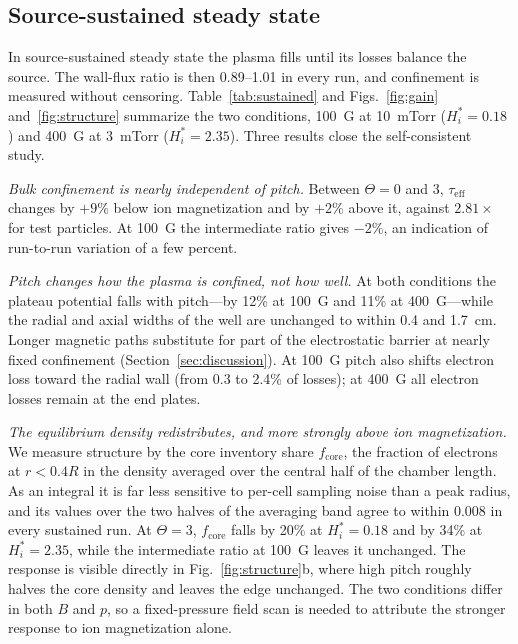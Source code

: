 \documentclass[11pt]{article}
\begin{document}
\subsection{Source-sustained steady state}
\label{sec:sustained}

In source-sustained steady state the plasma fills until its losses balance the source. The wall-flux ratio is then 0.89--1.01 in every run, and confinement is measured without censoring. Table~\ref{tab:sustained} and Figs.~\ref{fig:gain} and~\ref{fig:structure} summarize the two conditions, 100~G at 10~mTorr ($H_i^* = 0.18$) and 400~G at 3~mTorr ($H_i^* = 2.35$). Three results close the self-consistent study.

\emph{Bulk confinement is nearly independent of pitch.} Between $\Theta = 0$ and 3, $\tau_{\mathrm{eff}}$ changes by $+9\%$ below ion magnetization and by $+2\%$ above it, against $2.81\times$ for test particles. At 100~G the intermediate ratio gives $-2\%$, an indication of run-to-run variation of a few percent.

\emph{Pitch changes how the plasma is confined, not how well.} At both conditions the plateau potential falls with pitch---by 12\% at 100~G and 11\% at 400~G---while the radial and axial widths of the well are unchanged to within 0.4 and 1.7~cm. Longer magnetic paths substitute for part of the electrostatic barrier at nearly fixed confinement (Section~\ref{sec:discussion}). At 100~G pitch also shifts electron loss toward the radial wall (from 0.3 to 2.4\% of losses); at 400~G all electron losses remain at the end plates.

\emph{The equilibrium density redistributes, and more strongly above ion magnetization.} We measure structure by the core inventory share $f_{\mathrm{core}}$, the fraction of electrons at $r < 0.4R$ in the density averaged over the central half of the chamber length. As an integral it is far less sensitive to per-cell sampling noise than a peak radius, and its values over the two halves of the averaging band agree to within 0.008 in every sustained run. At $\Theta = 3$, $f_{\mathrm{core}}$ falls by 20\% at $H_i^* = 0.18$ and by 34\% at $H_i^* = 2.35$, while the intermediate ratio at 100~G leaves it unchanged. The response is visible directly in Fig.~\ref{fig:structure}b, where high pitch roughly halves the core density and leaves the edge unchanged. The two conditions differ in both $B$ and $p$, so a fixed-pressure field scan is needed to attribute the stronger response to ion magnetization alone.
\end{document}
